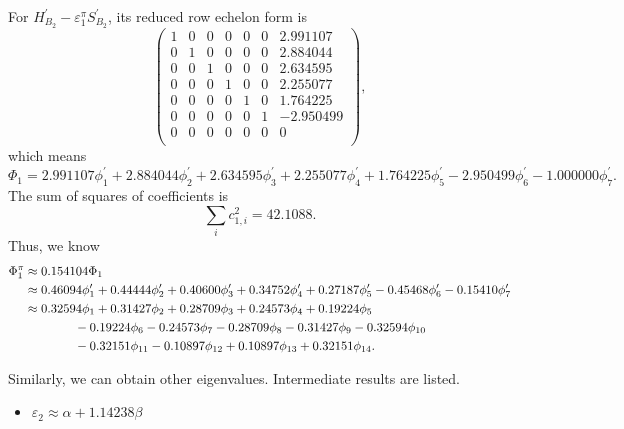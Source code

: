 \documentclass[a4paper]{book}
\newcommand{\Hp}{H^\prime}
\newcommand{\Sp}{S^\prime}
\begin{document}
\begin{solution}
\begin{enumerate}[label=(\alph*)]
		For $\Hp_{B_2}-\varepsilon^\pi_1 \Sp_{B_2}$, its reduced row echelon form is
		\begin{equation*}
			\begin{pmatrix}
			1 & 0 & 0 & 0 & 0 & 0 & 2.991107 \\
			0 & 1 & 0 & 0 & 0 & 0 & 2.884044 \\
			0 & 0 & 1 & 0 & 0 & 0 & 2.634595 \\
			0 & 0 & 0 & 1 & 0 & 0 & 2.255077 \\
			0 & 0 & 0 & 0 & 1 & 0 & 1.764225 \\
			0 & 0 & 0 & 0 & 0 & 1 & -2.950499 \\
			0 & 0 & 0 & 0 & 0 & 0 & 0 \\
			\end{pmatrix},
		\end{equation*}
		which means
		\begin{equation*}
			\Phi_1 = 2.991107 \phi^\prime_1 + 2.884044 \phi^\prime_2 + 2.634595 \phi^\prime_3 + 2.255077 \phi^\prime_4 + 1.764225 \phi^\prime_5 - 2.950499 \phi^\prime_6 - 1.000000 \phi^\prime_7.
		\end{equation*}
		The sum of squares of coefficients is
		\begin{equation*}
			\sum_{i} c^2_{1,i} = 42.1088.
		\end{equation*}
		Thus, we know
		\begin{align}
			\Phi^\pi_1 &\approx 0.154104 \Phi_1 \notag \\
			&\approx 0.46094 \phi^\prime_1 + 0.44444 \phi^\prime_2 + 0.40600 \phi^\prime_3 + 0.34752 \phi^\prime_4 + 0.27187 \phi^\prime_5 - 0.45468 \phi^\prime_6 - 0.15410 \phi^\prime_7 \notag \\
			&\approx 0.32594 \phi_1 + 0.31427 \phi_2 + 0.28709 \phi_3 + 0.24573 \phi_4 + 0.19224 \phi_5  \notag \\
			&\hspace*{4em} - 0.19224\phi_6 - 0.24573 \phi_7 - 0.28709 \phi_8 - 0.31427 \phi_9  -0.32594\phi_{10} \notag \\
			&\hspace*{4em}- 0.32151 \phi_{11} - 0.10897 \phi_{12} + 0.10897 \phi_{13} + 0.32151 \phi_{14} .
		\end{align}
		
		Similarly, we can obtain other eigenvalues. Intermediate results are listed.
		\begin{itemize}
		
		
		\item $\varepsilon_2 \approx \alpha + 1.14238 \beta$
		

\end{itemize}
\end{enumerate}
\end{solution}
\end{document}
